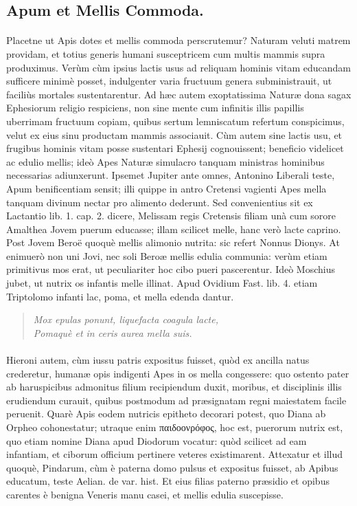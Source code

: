 \documentclass[a4paper, 11pt, oneside, polutonikogreek, latin]{article}
\begin{document}
\subsection{Apum et Mellis Commoda.}
\paragraph{}
Placetne ut Apis dotes et mellis commoda perscrutemur? Naturam veluti matrem providam, et totius generis humani susceptricem cum multis mammis supra produximus. Verùm cùm ipsius lactis usus ad reliquam hominis vitam educandam sufficere minimè posset, indulgenter varia fructuum genera subministrauit, ut faciliùs mortales sustentarentur. Ad hæc autem exoptatissima Naturæ dona sagax Ephesiorum religio respiciens, non sine mente cum infinitis illis papillis uberrimam fructuum copiam, quibus sertum lemniscatum refertum conspicimus, velut ex eius sinu productam mammis associauit. Cùm autem sine lactis usu, et frugibus hominis vitam posse sustentari Ephesij cognouissent; beneficio videlicet ac edulio mellis; ideò Apes Naturæ simulacro tanquam ministras hominibus necessarias adiunxerunt. Ipsemet Jupiter ante omnes, Antonino Liberali teste, Apum benificentiam sensit; illi quippe in antro Cretensi vagienti Apes mella tanquam divinum nectar pro alimento dederunt. Sed convenientius sit ex Lactantio lib. 1. cap. 2. dicere, Melissam regis Cretensis filiam unà cum sorore Amalthea Jovem puerum educasse; illam scilicet melle, hanc verò lacte caprino. Post Jovem Beroë quoquè mellis alimonio nutrita: sic refert Nonnus Dionys. At enimuerò non uni Jovi, nec soli Beroæ mellis edulia communia: verùm etiam primitivus mos erat, ut peculiariter hoc cibo pueri pascerentur. Ideò Moschius jubet, ut nutrix os infantis melle illinat. Apud Ovidium Fast. lib. 4. etiam Triptolomo infanti lac, poma, et mella edenda dantur.
\begin{quote}
\emph{Mox epulas ponunt, liquefacta coagula lacte,}\\
\hspace*{10mm}\emph{Pomaquè et in ceris aurea mella suis.}\\
\end{quote}
\paragraph{}
Hieroni autem, cùm iussu patris expositus fuisset, quòd ex ancilla natus crederetur, humanæ opis indigenti Apes in os mella congessere: quo ostento pater ab haruspicibus admonitus filium recipiendum duxit, moribus, et disciplinis illis erudiendum curauit, quibus postmodum ad præsignatam regni maiestatem facile peruenit. Quarè Apis eodem nutricis epitheto decorari potest, quo Diana ab Orpheo cohonestatur; utraque enim παιδοονρόφος, hoc est, puerorum nutrix est, quo etiam nomine Diana apud Diodorum vocatur: quòd scilicet ad eam infantiam, et ciborum officium pertinere veteres existimarent. Attexatur et illud quoquè, Pindarum, cùm è paterna domo pulsus et expositus fuisset, ab Apibus educatum, teste Aelian. de var. hist. Et eius filias paterno præsidio et opibus carentes è benigna Veneris manu casei, et mellis edulia suscepisse.
\end{document}
